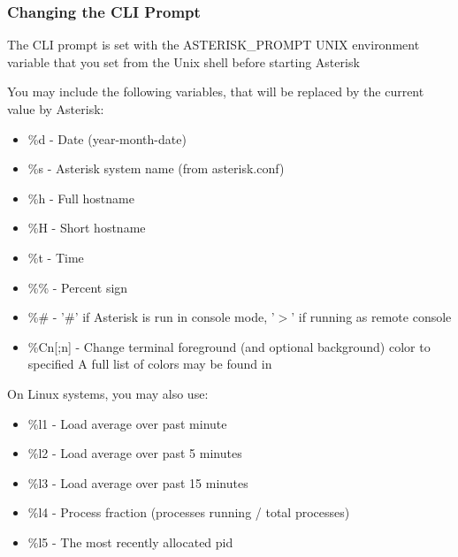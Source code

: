 \subsubsection{Changing the CLI Prompt}

The CLI prompt is set with the ASTERISK\_PROMPT UNIX environment variable that
you set from the Unix shell before starting Asterisk

You may include the following variables, that will be replaced by
the current value by Asterisk:

\begin{itemize}
    \item \%d - Date (year-month-date)
    \item \%s - Asterisk system name (from asterisk.conf)
    \item \%h - Full hostname
    \item \%H - Short hostname
    \item \%t - Time
    \item \%\% - Percent sign
    \item \%\# - '\#' if Asterisk is run in console mode, '$>$' if running as remote console
    \item \%Cn[;n] - Change terminal foreground (and optional background) color to specified
    A full list of colors may be found in 
\end{itemize}

On Linux systems, you may also use:

\begin{itemize}
    \item \%l1 - Load average over past minute
    \item \%l2 - Load average over past 5 minutes
    \item \%l3 - Load average over past 15 minutes
    \item \%l4 - Process fraction (processes running / total processes)
    \item \%l5 - The most recently allocated pid
\end{itemize}

